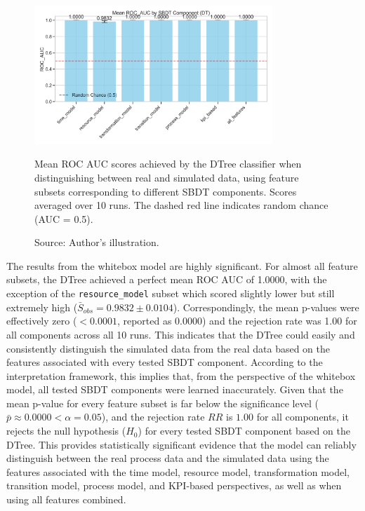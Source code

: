 \begin{figure}[htbp]
    \centering
    \includegraphics[width=0.8\textwidth]{figures/dt-roc-auc-by-component.png}
    \caption[Results Decision Tree]{Mean ROC AUC scores achieved by the DTree classifier when distinguishing between real and simulated data, using feature subsets corresponding to different SBDT components. Scores averaged over 10 runs. The dashed red line indicates random chance (AUC = 0.5).}
    \label{fig:dt-roc-auc}
    \caption*{Source: Author's illustration.}
\end{figure}

The results from the whitebox model are highly significant. For almost all feature subsets, the DTree achieved a perfect mean ROC AUC of 1.0000, with the exception of the \texttt{resource\_model} subset which scored slightly lower but still extremely high ($\bar{S}_{obs}=0.9832 \pm 0.0104$). Correspondingly, the mean p-values were effectively zero ($< 0.0001$, reported as 0.0000) and the rejection rate was 1.00 for all components across all 10 runs. This indicates that the DTree could easily and consistently distinguish the simulated data from the real data based on the features associated with every tested SBDT component. According to the interpretation framework, this implies that, from the perspective of the whitebox model, all tested SBDT components were learned inaccurately.
Given that the mean p-value for every feature subset is far below the significance level ($\bar{p} \approx 0.0000 < \alpha = 0.05$), and the rejection rate $RR$ is $1.00$ for all components, it rejects the null hypothesis ($H_0$) for every tested SBDT component based on the DTree. This provides statistically significant evidence that the model can reliably distinguish between the real process data and the simulated data using the features associated with the time model, resource model, transformation model, transition model, process model, and KPI-based perspectives, as well as when using all features combined.

